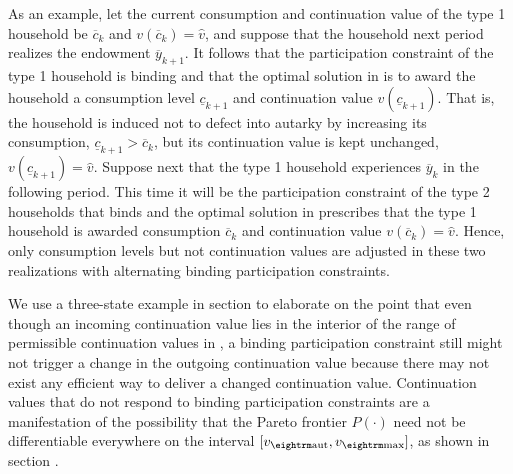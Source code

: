 As an example, let the current consumption and continuation value
of the type 1 household be $\overline c_k$ and $v(\overline c_k) =
\hat v$, and suppose that the household next period realizes the
endowment $\overline y_{k+1}$. It follows that the participation
constraint of the type 1 household is binding and that the optimal
solution in  is to award the household a consumption
level $\underline c_{k+1}$ and continuation value $v(\underline
c_{k+1})$. That is, the household is induced not to defect into
autarky by increasing its consumption, $\underline c_{k+1} >
\overline c_k$, but its continuation value is kept unchanged,
$v(\underline c_{k+1}) = \hat v$. Suppose next that the type 1
household experiences $\overline y_k$ in the following period.
This time it will be the participation constraint of the type 2
households that binds and the optimal solution in 
prescribes that the type 1 household is awarded consumption
$\overline c_k$ and continuation value $v(\overline c_k)=\hat v$.
Hence, only consumption levels but not continuation values are
adjusted in these two realizations with alternating binding
participation constraints.

We use a three-state example in section  to
elaborate on the point that even though an incoming continuation
value lies in the interior of the range of permissible
continuation values in , a binding participation
constraint still might  not trigger a change in the outgoing
continuation value because there may not exist any efficient way
to deliver a changed continuation value. Continuation values that
do not respond to binding participation constraints are a
manifestation of the possibility that the Pareto frontier
$P(\cdot)$ need not be differentiable everywhere on the interval
$[v_{\rm aut}, v_{\rm max}]$, as shown in section
.






